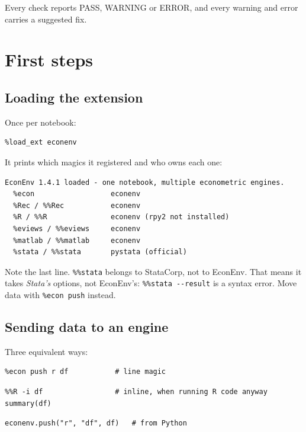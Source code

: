 \documentclass[11pt,a4paper]{report}
\begin{document}
Every check reports PASS, WARNING or ERROR, and every warning and error carries
a suggested fix.

\chapter{First steps}

\section{Loading the extension}

Once per notebook:

\begin{lstlisting}
%load_ext econenv
\end{lstlisting}

It prints which magics it registered and who owns each one:

\begin{lstlisting}
EconEnv 1.4.1 loaded - one notebook, multiple econometric engines.
  %econ                  econenv
  %Rec / %%Rec           econenv
  %R / %%R               econenv (rpy2 not installed)
  %eviews / %%eviews     econenv
  %matlab / %%matlab     econenv
  %stata / %%stata       pystata (official)
\end{lstlisting}

\begin{note}
Note the last line. \texttt{\%\%stata} belongs to StataCorp, not to EconEnv.
That means it takes \emph{Stata's} options, not EconEnv's: \texttt{\%\%stata
-{}-result} is a syntax error. Move data with \texttt{\%econ push} instead.
\end{note}

\section{Sending data to an engine}

Three equivalent ways:

\begin{lstlisting}
%econ push r df           # line magic
\end{lstlisting}

\begin{lstlisting}
%%R -i df                 # inline, when running R code anyway
summary(df)
\end{lstlisting}

\begin{lstlisting}
econenv.push("r", "df", df)   # from Python
\end{lstlisting}
\end{document}
